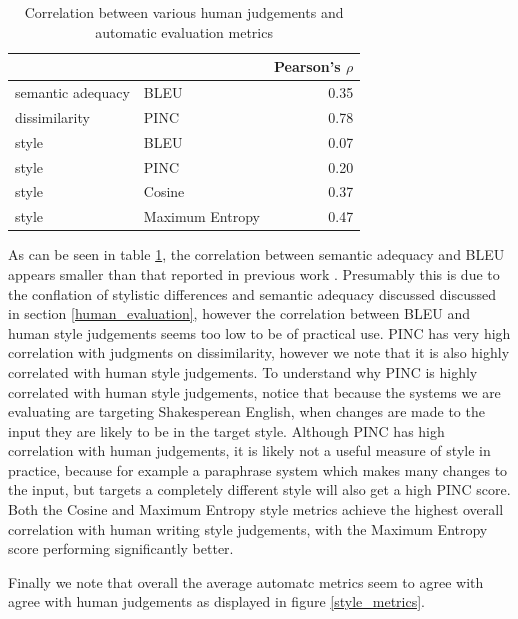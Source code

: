 \documentclass[10pt,a5paper,twoside]{article}
\begin{document}
\begin{table}
  \begin{center}
  \begin{tabular}{|l|l|r|}
    \hline
    & & Pearson's $\rho$ \\
    \hline
    \hline
    semantic adequacy & BLEU & 0.35 \\
    \hline
    dissimilarity & PINC & 0.78 \\
    \hline
    style & BLEU & 0.07 \\
    \hline
    style & PINC & 0.20 \\
    \hline
    style & Cosine & 0.37 \\
    \hline
    style & Maximum Entropy & 0.47 \\
    \hline
  \end{tabular}
  \end{center}
  \caption{Correlation between various human judgements and automatic evaluation metrics}
  \label{correlation}
\end{table}

As can be seen in table \ref{correlation}, the correlation between semantic adequacy and BLEU appears smaller than that reported in previous work \cite{chen11}.  Presumably this is
due to the conflation of stylistic differences and semantic adequacy discussed discussed in section \ref{human_evaluation}, however the correlation between BLEU and human style
judgements seems too low to be of practical use.  PINC has very high correlation with judgments on dissimilarity, however we note that it is also highly correlated with human style
judgements.  To understand why PINC is highly correlated with human style judgements, notice that because the systems we are evaluating are targeting Shakesperean English, when changes
are made to the input they are likely to be in the target style.  Although PINC has high correlation with human judgements, it is likely not a useful measure of style in practice,
because for example a paraphrase system which makes many changes to the input, but targets a completely different style will also get a high PINC score.  
Both the Cosine and Maximum Entropy style metrics achieve the highest overall correlation with human writing style judgements, with the Maximum Entropy score performing significantly better.

Finally we note that overall the average automatc metrics seem to agree with agree with human judgements as displayed in figure \ref{style_metrics}.
\end{document}
